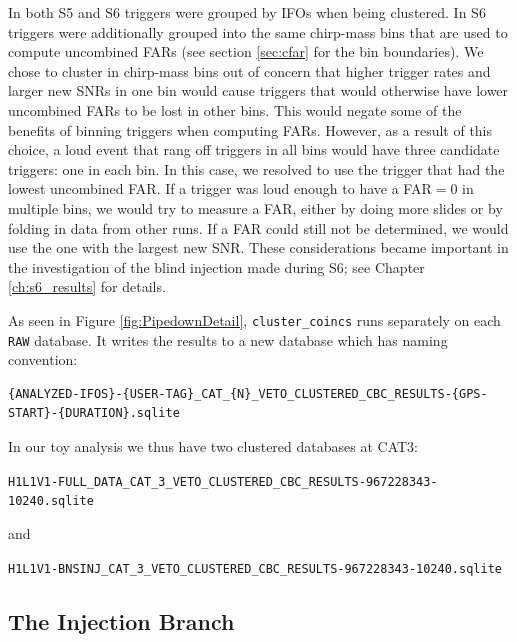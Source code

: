 In both \ac{S5} and \ac{S6} triggers were grouped by \acp{IFO} when being clustered. In \ac{S6} triggers were additionally grouped into the same chirp-mass bins that are used to compute uncombined \acp{FAR} (see section \ref{sec:cfar} for the bin boundaries). We chose to cluster in chirp-mass bins out of concern that higher trigger rates and larger new \acp{SNR} in one bin would cause triggers that would otherwise have lower uncombined \acp{FAR} to be lost in other bins. This would negate some of the benefits of binning triggers when computing \acp{FAR}. However, as a result of this choice, a loud event that rang off triggers in all bins would have three candidate triggers: one in each bin. In this case, we resolved to use the trigger that had the lowest uncombined \ac{FAR}. If a trigger was loud enough to have a \ac{FAR}$= 0$ in multiple bins, we would try to measure a \ac{FAR}, either by doing more slides or by folding in data from other runs. If a \ac{FAR} could still not be determined, we would use the one with the largest new \ac{SNR}. These considerations became important in the investigation of the blind injection made during \ac{S6}; see Chapter \ref{ch:s6_results} for details.

As seen in Figure \ref{fig:PipedownDetail}, \verb|cluster_coincs| runs separately on each \verb|RAW| database. It writes the results to a new database which has naming convention:
\begin{center}
\begin{footnotesize}
\begin{verbatim}
{ANALYZED-IFOS}-{USER-TAG}_CAT_{N}_VETO_CLUSTERED_CBC_RESULTS-{GPS-START}-{DURATION}.sqlite
\end{verbatim}
\end{footnotesize}
\end{center}
In our toy analysis we thus have two clustered databases at CAT3:
\begin{footnotesize}
\begin{center}
\verb|H1L1V1-FULL_DATA_CAT_3_VETO_CLUSTERED_CBC_RESULTS-967228343-10240.sqlite|
\end{center}
\end{footnotesize}
and
\begin{center}
\begin{footnotesize}
\verb|H1L1V1-BNSINJ_CAT_3_VETO_CLUSTERED_CBC_RESULTS-967228343-10240.sqlite|
\end{footnotesize}
\end{center}

\subsection{The Injection Branch}

